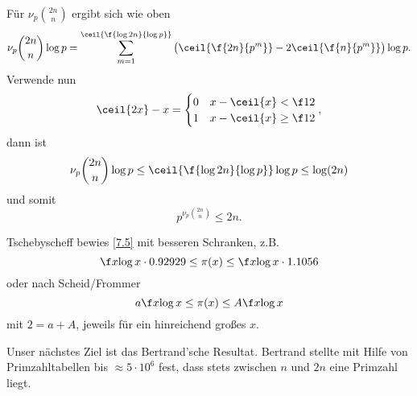 \begin{nt} \label{7.6}
	Für $\nu_p \binom{2n}{n}$ ergibt sich wie oben
	\[
		\nu_p \binom {2n}{n} \log p = \sum_{m=1}^{\ceil{\f{\log 2n}{\log p}}} \big( \ceil{\f{2n}{p^m}} - 2 \ceil{\f{n}{p^m}} \big) \log p.
	\]
	Verwende nun
	\[
		\ceil{2x} - {x} = \begin{cases}
			0 & x - \ceil{x} < \f 12 \\
			1 & x - \ceil{x} \ge \f 12
		\end{cases},
	\]
	dann ist
	\[
		\nu_p \binom{2n}{n} \log p
		\le \ceil{\f {\log 2n}{\log p}}	 \log p
		\le \log(2n)
	\]
	und somit
	\begin{equation} \label{eq:7.6}
		p^{\nu_p \binom{2n}{n}} \le 2n.
		\tag{7.6}
	\end{equation}
\end{nt}




\begin{nt} \label{7.7}
	Tschebyscheff bewies \ref{7.5} mit besseren Schranken, z.B.
	\[
		\f x{\log x} \cdot 0.92929
		\le \pi(x) \le
		\f x{\log x} \cdot 1.1056
	\]
	oder nach Scheid/Frommer %
	\[
		a \f x{\log x}
		\le \pi(x) \le
		A \f x{\log x}
	\]
	mit $2 = a + A$, jeweils für ein hinreichend großes $x$.
\end{nt}

Unser nächstes Ziel ist das Bertrand'sche Resultat.
Bertrand stellte mit Hilfe von Primzahltabellen bis $\approx 5 \cdot 10^6$ fest, dass stets zwischen $n$ und $2n$ eine Primzahl liegt.

